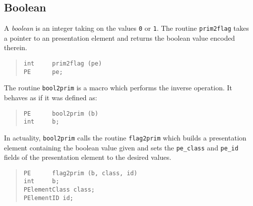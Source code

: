 \subsection	{Boolean}
A {\em boolean\/} is an integer taking on the values \verb"0" or \verb"1".
The routine \verb"prim2flag" takes a pointer to an presentation element and
returns the boolean value encoded therein.
\begin{quote}\small\begin{verbatim}
int     prim2flag (pe)
PE      pe;
\end{verbatim}\end{quote}
The routine \verb"bool2prim" is a macro which performs the inverse operation.
It behaves as if it was defined as:
\begin{quote}\small\begin{verbatim}
PE      bool2prim (b)
int     b;
\end{verbatim}\end{quote}
In actuality,
\verb"bool2prim" calls the routine \verb"flag2prim" which builds a
presentation element containing the boolean value given and sets the
\verb"pe_class" and \verb"pe_id" fields of the presentation element to the
desired values.
\begin{quote}\small\begin{verbatim}
PE      flag2prim (b, class, id)
int     b;
PElementClass class;
PElementID id;
\end{verbatim}\end{quote}


